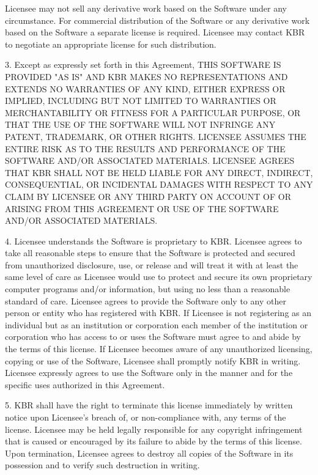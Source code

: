 Licensee may not sell any derivative work based on the Software under any circumstance.
For commercial distribution of the Software or any derivative work based on the Software
a separate license is required. Licensee may contact KBR to negotiate an appropriate
license for such distribution.

\num{3}. Except as expressly set forth in this Agreement, THIS SOFTWARE IS PROVIDED "AS IS"
AND KBR MAKES NO REPRESENTATIONS AND EXTENDS NO WARRANTIES OF ANY KIND, EITHER EXPRESS
OR IMPLIED, INCLUDING BUT NOT LIMITED TO WARRANTIES OR MERCHANTABILITY OR FITNESS
FOR A PARTICULAR PURPOSE, OR THAT THE USE OF THE SOFTWARE WILL NOT INFRINGE ANY PATENT,
TRADEMARK, OR OTHER RIGHTS. LICENSEE ASSUMES THE ENTIRE RISK AS TO THE RESULTS AND
PERFORMANCE OF THE SOFTWARE AND/OR ASSOCIATED MATERIALS. LICENSEE AGREES THAT KBR
SHALL NOT BE HELD LIABLE FOR ANY DIRECT, INDIRECT, CONSEQUENTIAL, OR INCIDENTAL DAMAGES
WITH RESPECT TO ANY CLAIM BY LICENSEE OR ANY THIRD PARTY ON ACCOUNT OF OR ARISING
FROM THIS AGREEMENT OR USE OF THE SOFTWARE AND/OR ASSOCIATED MATERIALS.

\num{4}. Licensee understands the Software is proprietary to KBR. Licensee agrees to take
all reasonable steps to ensure that the Software is protected and secured from unauthorized
disclosure, use, or release and will treat it with at least the same level of care
as Licensee would use to protect and secure its own proprietary computer programs
and/or information, but using no less than a reasonable standard of care.  Licensee
agrees to provide the Software only to any other person or entity who has registered
with KBR. If Licensee is not registering as an individual but as an institution or
corporation each member of the institution or corporation who has access to or
uses the Software must agree to and abide by the terms of this license. If Licensee
becomes aware of any unauthorized licensing, copying or use of the Software, Licensee
shall promptly notify KBR in writing. Licensee expressly agrees to use the Software
only in the manner and for the specific uses authorized in this Agreement.

\num{5}. KBR shall have the right to terminate this license immediately by written notice
upon Licensee's breach of, or non-compliance with, any terms of the license. Licensee
may be held legally responsible for any copyright infringement that is caused or
encouraged by its failure to abide by the terms of this license. Upon termination,
Licensee agrees to destroy all copies of the Software in its possession and to verify
such destruction in writing.


